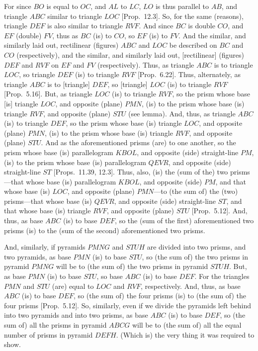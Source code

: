 \begin{Parallel}{}{}
{For since $BO$ is equal to $OC$, and $AL$ to $LC$,
$LO$ is thus parallel to $AB$, and triangle $ABC$ similar to triangle $LOC$
[Prop.~12.3]. So, for the same (reasons), triangle $DEF$ is also similar
to triangle $RVF$. And since $BC$ is double $CO$, and $EF$ (double) $FV$, thus
as $BC$ (is) to $CO$, so $EF$ (is) to $FV$. And the similar, and similarly laid out, rectilinear
(figures) $ABC$ and $LOC$ be described on $BC$ and $CO$ (respectively),
and the similar, and similarly laid out, [rectilinear] (figures) $DEF$ and $RVF$ on
$EF$ and $FV$ (respectively). Thus, as triangle $ABC$ is to triangle $LOC$, so triangle
$DEF$ (is) to triangle $RVF$ [Prop.~6.22]. Thus, alternately, as
triangle $ABC$ is to [triangle] $DEF$, so [triangle] $LOC$ (is) to triangle $RVF$ [Prop.~5.16]. But, as triangle $LOC$ (is) to triangle $RVF$, so the prism whose
base [is] triangle $LOC$, and opposite (plane) $PMN$, (is) to the prism whose base (is) triangle
$RVF$, and opposite (plane) $STU$ (see lemma). And, thus, as triangle $ABC$ (is) to triangle $DEF$,  so the prism whose base (is) triangle $LOC$, and opposite (plane) $PMN$, (is) to the
prism whose base (is) triangle $RVF$, and opposite (plane) $STU$. And as the aforementioned
prisms (are) to one another, so the prism whose base (is) parallelogram $KBOL$, and opposite
(side) straight-line $PM$, (is) to the prism whose
base (is) parallelogram $QEVR$, and opposite (side) straight-line $ST$ [Props.~11.39, 12.3]. Thus, also, (is) the (sum of the) two prisms---that whose base
(is) parallelogram $KBOL$, and opposite (side) $PM$, and that whose base (is) $LOC$,
and opposite (plane) $PMN$---to (the sum of) the  (two) prisms---that whose base (is) $QEVR$, and opposite
(side) straight-line $ST$, and that whose base (is) triangle $RVF$, and opposite (plane) $STU$
[Prop.~5.12]. And, thus, as base $ABC$ (is) to base $DEF$, so the 
(sum of the first) aforementioned two prisms (is) to the (sum  of the second) aforementioned two prisms.

And, similarly, if pyramids $PMNG$ and $STUH$ are divided into two prisms, and
two pyramids, as base $PMN$ (is) to base $STU$, so (the sum of) the  two prisms in pyramid
$PMNG$ will be to (the sum of) the  two prisms in pyramid $STUH$. But, as base $PMN$ (is) to
base $STU$, so base $ABC$ (is) to base $DEF$. For  the triangles $PMN$ and
$STU$ (are) equal to $LOC$ and $RVF$, respectively. And, thus, as base $ABC$ (is)
to base $DEF$, so (the sum of) the four prisms (is) to (the sum of) the four prisms [Prop.~5.12].
So, similarly, even if we  divide the pyramids left behind into two pyramids
and into two prisms, as base $ABC$ (is) to base $DEF$, so (the sum of) all the prisms in pyramid
$ABCG$ will be to (the sum of) all the equal number of prisms in pyramid $DEFH$. (Which is) the
very thing it was required to show.}
\end{Parallel}

